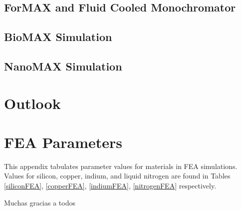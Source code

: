 \documentclass[preprint]{iucr}              %
\begin{document}
\subsection{ForMAX and Fluid Cooled Monochromator}\label{formax}
\subsection{BioMAX Simulation}\label{biomax}
\subsection{NanoMAX Simulation}\label{nanomax}
\section{Outlook}


\appendix
\section{FEA Parameters}\label{feaparameters}

This appendix tabulates parameter values for materials in FEA simulations. Values for silicon, copper, indium, and liquid nitrogen are found in Tables \ref{siliconFEA}, \ref{copperFEA}, \ref{indiumFEA}, \ref{nitrogenFEA} respectively.
\vspace{1.5cm}







Muchas gracias a todos


\end{document}
